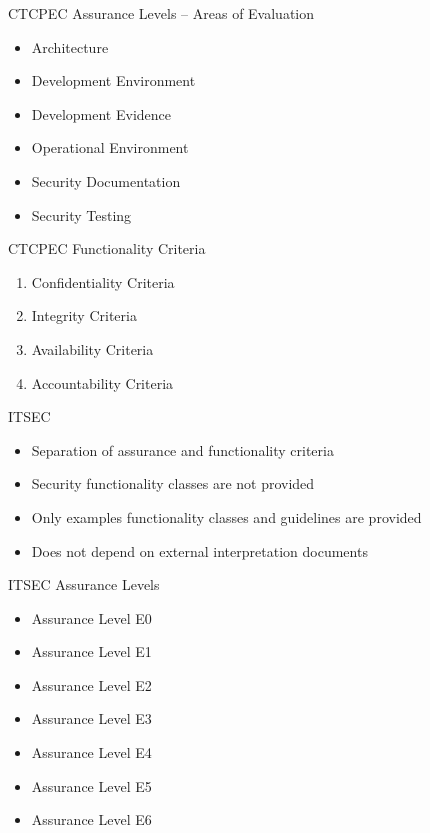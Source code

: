 \documentclass[xcolor=dvipsname,t]{beamer}
\begin{document}
\begin{frame} {CTCPEC Assurance Levels -- Areas of Evaluation}
    \begin{itemize}
        \item Architecture
        \item Development Environment
        \item Development Evidence
        \item Operational Environment
        \item Security Documentation
        \item Security Testing
    \end{itemize}
\end{frame}

\begin{frame} {CTCPEC Functionality Criteria}
    \begin{enumerate}
        \item Confidentiality Criteria
        \item Integrity Criteria
        \item Availability Criteria
        \item Accountability Criteria
    \end{enumerate}
\end{frame}

\begin{frame} {ITSEC}
    \begin{itemize}
        \item Separation of assurance and functionality criteria
        \item Security functionality classes are not provided
        \item Only examples functionality classes and guidelines
              are provided
        \item Does not depend on external interpretation documents
    \end{itemize}
\end{frame}

\begin{frame} {ITSEC Assurance Levels}
    \begin{itemize}
        \item Assurance Level E0
        \item Assurance Level E1
        \item Assurance Level E2
        \item Assurance Level E3
        \item Assurance Level E4
        \item Assurance Level E5
        \item Assurance Level E6
    \end{itemize}
\end{frame}
\end{document}
